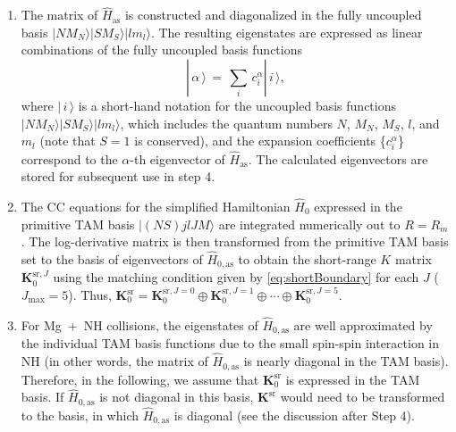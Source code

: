 \documentclass[reprint,amssymb,noeprint,twocolumn,longbibliography]{revtex4-2}
\begin{document}
\begin{enumerate}

\item
{
The matrix of $\hat{H}_\text{as}$ is constructed and diagonalized in the fully uncoupled basis  $|NM_N\rangle|SM_S\rangle|lm_l\rangle$. 
The resulting eigenstates are expressed as linear combinations of the fully uncoupled basis functions
\begin{equation}
\label{eq:eigenstate}
|\, \alpha\, \rangle\, =\,  \sum_{i}^{}\, c^\alpha_i |\, i\, \rangle,
\end{equation}
where $|\,i\,\rangle$ is a short-hand notation for the uncoupled basis functions $|NM_N\rangle|SM_S\rangle|lm_l\rangle$, which includes the quantum numbers $N$, $M_N$, $M_S$, $l$, and $m_l$ (note that $S=1$ is conserved), and the expansion coefficients \{$c_i^\alpha$\} correspond to the $\alpha$-th eigenvector of $\hat{H}_\text{as}$.  
The calculated eigenvectors are stored for subsequent use in step 4. 
}

\item
{
The CC equations for the simplified Hamiltonian $\hat{H}_0$ expressed in the primitive TAM basis  $|(NS)jlJM\rangle$ are integrated numerically out to $R=R_m$.  
The log-derivative matrix is then transformed from the primitive TAM basis set to the basis of eigenvectors of $\hat{H}_{0,\text{as}}$ to obtain
the short-range $K$ matrix $\bm{K}_\mathrm{0}^{\text{sr}, J}$ using the matching condition given by \cref{eq:shortBoundary} for each $J$ ($J_\text{max}=5$). 
Thus, $\bm{K}_\mathrm{0}^\text{sr}=\bm{K}_\mathrm{0}^{\text{sr}, J=0} \oplus \bm{K}_\mathrm{0}^{\text{sr},J=1} \oplus \cdots \oplus \bm{K}_\mathrm{0}^{\text{sr},J=5}$.
}


\item
{
For Mg~+~NH collisions, the eigenstates of $\hat{H}_{0,\text{as}}$ are well approximated by the individual TAM basis functions due to the small spin-spin interaction in NH (in other words, the matrix of $\hat{H}_{0,\text{as}}$ is nearly diagonal in the TAM basis). Therefore, in the following, we assume that $\bm{K}_\mathrm{0}^{\text{sr}}$ is expressed in the TAM basis. If $\hat{H}_{0,\text{as}}$ is not diagonal in this basis,  $\bm{K}^\text{sr}$ would need to be transformed to the basis, in which  $\hat{H}_{0,\text{as}}$ is diagonal (see the discussion after Step 4).
}



\end{enumerate}
\end{document}

